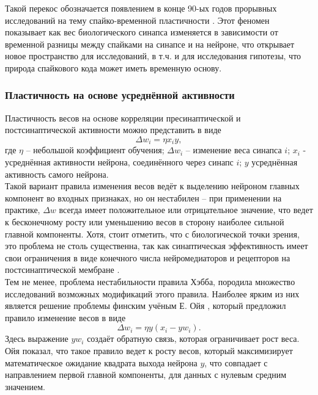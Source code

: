 \documentclass[a4paper,10pt]{article}
\begin{document}
\indent Такой перекос обозначается появлением в конце 90-ых годов прорывных исследований на тему спайко-временной пластичности \cite{stdp1,stdp2,stdp3,stdp4}. Этот феномен показывает как вес биологического синапса изменяется в зависимости от временной разницы между спайками на синапсе и на нейроне, что открывает новое пространство для исследований, в т.ч. и для исследования гипотезы, что природа спайкового кода может иметь временную основу.\\

\subsubsection{Пластичность на основе усреднённой активности}
\indent Пластичность весов на основе корреляции пресинаптической и постсинаптической активности можно представить в виде
\begin{equation*}
\Delta w_{i} = \eta x_{i}y,
\end{equation*}
где $\eta$ -- небольшой коэффициент обучения; $\Delta w_{i}$ -- изменение веса синапса $i$; $x_{i}$ - усреднённая активности нейрона, соединённого через синапс $i$; $y$ усреднённая активность самого нейрона.\\
\indent Такой вариант правила изменения весов ведёт к выделению нейроном главных компонент \cite{anderson1963} во входных признаках, но он нестабилен -- при применении на практике, $\Delta w$ всегда имеет положительное или отрицательное значение, что ведет к бесконечному росту или уменьшению весов в сторону наиболее сильной главной компоненты. Хотя, стоит отметить, что с биологической точки зрения, это проблема не столь существенна, так как синаптическая эффективность имеет свои ограничения в виде конечного числа нейромедиаторов и рецепторов на постсинаптической мембране \cite{NeuralAndAdaptiveSystems}.\\
\indent Тем не менее, проблема нестабильности правила Хэбба, породила множество исследований возможных модификаций этого правила. Наиболее ярким из них является решение проблемы финским учёным Е. Ойя \cite{oja1997nonlinear}, который предложил правило изменение весов в виде
\begin{equation*}
\Delta w_{i} = \eta y (x_{i} - yw_{i}).
\end{equation*}
Здесь выражение $yw_{i}$ создаёт обратную связь, которая ограничивает рост веса. Ойя показал, что такое правило ведет к росту весов, который максимизирует математическое ожидание квадрата выхода нейрона $y$, что совпадает с направлением первой главной компоненты, для данных с нулевым средним значением.\\
\end{document}
